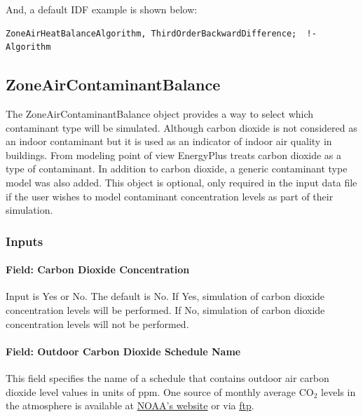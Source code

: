 And, a default IDF example is shown below:

\begin{lstlisting}
ZoneAirHeatBalanceAlgorithm, ThirdOrderBackwardDifference;  !- Algorithm
\end{lstlisting}

\subsection{ZoneAirContaminantBalance}\label{zoneaircontaminantbalance}

The ZoneAirContaminantBalance object provides a way to select which contaminant type will be simulated. Although carbon dioxide is not considered as an indoor contaminant but it is used as an indicator of indoor air quality in buildings. From modeling point of view EnergyPlus treats carbon dioxide as a type of contaminant. In addition to carbon dioxide, a generic contaminant type model was also added. This object is optional, only required in the input data file if the user wishes to model contaminant concentration levels as part of their simulation.

\subsubsection{Inputs}\label{inputs-9-021}

\paragraph{Field: Carbon Dioxide Concentration}\label{field-carbon-dioxide-concentration}

Input is Yes or No. The default is No. If Yes, simulation of carbon dioxide concentration levels will be performed. If No, simulation of carbon dioxide concentration levels will not be performed.

\paragraph{Field: Outdoor Carbon Dioxide Schedule Name}\label{field-outdoor-carbon-dioxide-schedule-name}

This field specifies the name of a schedule that contains outdoor air carbon dioxide level values in units of ppm. One source of monthly average CO\(_{2}\) levels in the atmosphere is available at \href{http://www.esrl.noaa.gov/gmd/ccgg/trends/}{NOAA's website} or via \href{ftp://aftp.cmdl.noaa.gov/products/trends/co2/co2_mm_mlo.txt}{ftp}.

